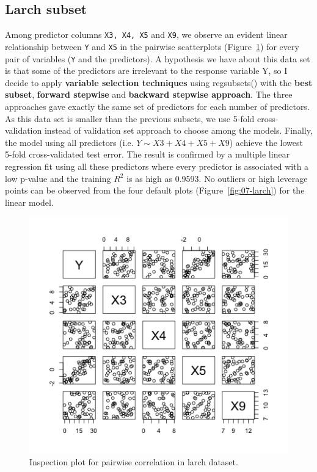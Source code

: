 \documentclass{article}
\begin{document}
\subsection{Larch subset}

Among predictor columns {\tt X3, X4, X5} and {\tt X9}, we observe an evident linear relationship between {\tt Y} and {\tt X5} in the pairwise scatterplots (Figure~\ref{fig:06-larch}) for every pair of variables ({\tt Y} and the predictors). A hypothesis we have about this data set is that some of the predictors are irrelevant to the response variable Y, so I decide to apply \textbf{variable selection techniques} using regsubsets() with the \textbf{best subset}, \textbf{forward stepwise} and \textbf{backward stepwise approach}. The three approaches gave exactly the same set of predictors for each number of predictors. As this data set is smaller than the previous subsets, we use 5-fold cross-validation instead of validation set approach to choose among the models. Finally, the model using all predictors (i.e. $Y \sim X3+X4+X5+X9$) achieve the lowest 5-fold cross-validated test error. The result is confirmed by a multiple linear regression fit using all these predictors where every predictor is associated with a low p-value and the training $R^2$ is as high as 0.9593. No outliers or high leverage points can be observed from the four default plots (Figure~\ref{fig:07-larch}) for the linear model.

\begin{figure}[h!]
  \includegraphics[width=\linewidth]{project/images/06-larch.png}
  \caption{Inspection plot for pairwise correlation in larch dataset.}
  \label{fig:06-larch}
\end{figure}
\end{document}
